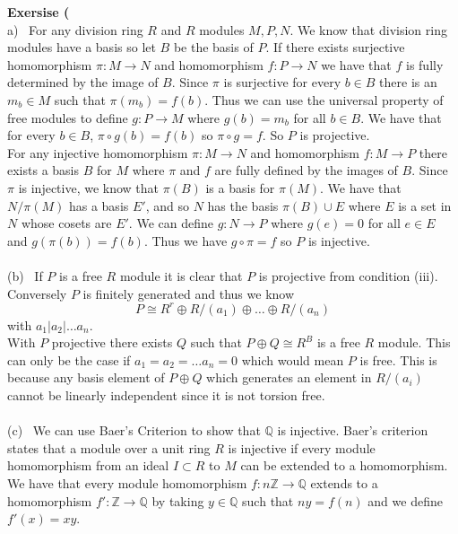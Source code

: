 \documentclass[12pt]{article}
\newenvironment{ques}[1]{\textbf{Exersise #1}\vspace{1 mm}\\ }{\bigskip}
\theoremstyle{definition}
\newcommand{\Q}{\mathbb Q}
\newcommand{\Z}{\mathbb Z}
\begin{document}
\begin{ques}{8.6}
	(a) \ For any division ring $R$ and $R$ modules $M, P, N$. We know that
	division ring modules have a basis so let $B$ be the basis of $P$. If
	there exists surjective homomorphism $\pi:M \to N$ and homomorphism $f:P
	\to N$ we have that $f$ is fully determined by the image of $B$. Since
	$\pi$ is surjective for every $b \in B$ there is an $m_b \in M$ such that
	$\pi(m_b) = f(b)$. Thus we can use the universal property of free modules to
	define $g: P \to M$ where $g(b) = m_b$ for all $b \in B$. We have that for
	every $b \in B$, $\pi \circ g(b) = f(b)$ so $\pi \circ g = f$. So $P$
	is projective.\\
	For any injective homomorphism $\pi: M \to N$ and homomorphism $f : M \to
	P$ there exists a basis $B$ for $M$ where $\pi$ and $f$ are fully defined
	by the images of $B$. Since $\pi$ is injective, we know that $\pi(B)$ is a
	basis for $\pi(M)$. We have that $N/\pi(M)$ has a basis $E'$, and so $N$ has
	the basis $\pi(B) \cup E$ where $E$ is a set in $N$ whose cosets are $E'$.
	We can define $g:N \to P$ where $g(e) = 0$ for all $e \in E$ and $g(\pi(b))
	= f(b)$. Thus we have $g\circ\pi = f$ so $P$ is injective.
	\\
	\\
	(b) \ If $P$ is a free $R$ module it is clear that $P$ is projective from
	condition (iii).\\ 
	Conversely $P$ is finitely generated and thus we know
	$$P \cong R^r \oplus R/(a_1) \oplus \dots \oplus R/(a_n)$$
	with $a_1 | a_2 | \dots a_n$. \\
	With $P$ projective there exists $Q$ such that $P \oplus Q \cong R^B$ is a
	free $R$ module. This can only be the case if $a_1 =a_2 = \dots a_n = 0$
	which would mean $P$ is free. This is because any basis element of $P \oplus Q$
	which generates an element in $R/ (a_i)$ cannot be linearly independent
	since it is not torsion free.\\
	\\	
	(c) \
	We can use Baer's Criterion to show that $\Q$ is injective. Baer's
	criterion states that a module over a unit ring $R$ is injective if every
	module homomorphism from an ideal $I \subset R$ to $M$ can be extended to a
	homomorphism. We have that every module homomorphism $f:n\Z \to \Q$ extends
	to a homomorphism $f':\Z \to \Q$ by taking $y \in \Q$ such that $ny = f(n)$
	and we define $f'(x) = xy$.\\

\end{ques}
\end{document}
